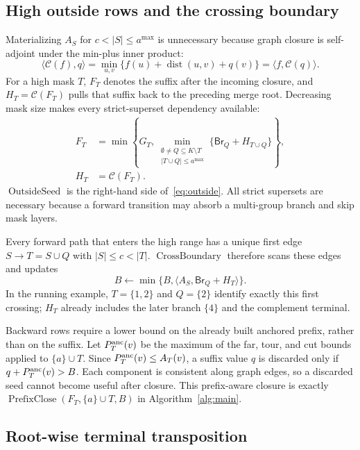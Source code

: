\documentclass[sigconf,nonacm]{acmart}
\newcommand{\dist}{\operatorname{dist}}
\newcommand{\Clos}{\mathcal{C}}
\newcommand{\Br}{\mathsf{Br}}
\newcommand{\inner}[2]{\langle #1,#2\rangle}
\newcommand{\PrefixClosure}{\operatorname{PrefixClose}}
\newcommand{\OutsideSeed}{\operatorname{OutsideSeed}}
\newcommand{\CrossBoundary}{\operatorname{CrossBoundary}}
\begin{document}
\subsection{High outside rows and the crossing boundary}
\label{sec:outside}

Materializing $A_S$ for $c<|S|\leq a^{\max}$ is unnecessary because graph closure is self-adjoint under the min-plus inner product:
\begin{equation}
 \inner{\Clos(f)}{q}
 =\min_{u,v}\{f(u)+\dist(u,v)+q(v)\}
 =\inner{f}{\Clos(q)}.
 \label{eq:selfadjoint}
\end{equation}
For a high mask $T$, $F_T$ denotes the suffix after the incoming closure, and $H_T=\Clos(F_T)$ pulls that suffix back to the preceding merge root.  Decreasing mask size makes every strict-superset dependency available:
\begin{align}
 F_T&=\min\!\left\{G_T,
 \min_{\substack{\emptyset\neq Q\subseteq K\setminus T\\
 |T\cup Q|\leq a^{\max}}}
 \{\Br_Q+H_{T\cup Q}\}\right\},
 \label{eq:outside}\\
 H_T&=\Clos(F_T).
 \label{eq:highclosure}
\end{align}
$\OutsideSeed$ is the right-hand side of~\eqref{eq:outside}.  All strict supersets are necessary because a forward transition may absorb a multi-group branch and skip mask layers.

Every forward path that enters the high range has a unique first edge $S\rightarrow T=S\cup Q$ with $|S|\leq c<|T|$.  $\CrossBoundary$ therefore scans these edges and updates
\begin{equation}
 B\leftarrow\min\{B,\inner{A_S}{\Br_Q+H_T}\}.
 \label{eq:crossing}
\end{equation}
In the running example, $T=\{1,2\}$ and $Q=\{2\}$ identify exactly this first crossing; $H_T$ already includes the later branch $\{4\}$ and the complement terminal.

Backward rows require a lower bound on the already built anchored prefix, rather than on the suffix.  Let $P^{\rm anc}_T(v)$ be the maximum of the far, tour, and cut bounds applied to $\{a\}\cup T$.  Since $P^{\rm anc}_T(v)\leq A_T(v)$, a suffix value $q$ is discarded only if $q+P^{\rm anc}_T(v)>B$.  Each component is consistent along graph edges, so a discarded seed cannot become useful after closure.  This prefix-aware closure is exactly $\PrefixClosure(F_T,\{a\}\cup T,B)$ in Algorithm~\ref{alg:main}.

\subsection{Root-wise terminal transposition}
\label{sec:transpose}
\end{document}
